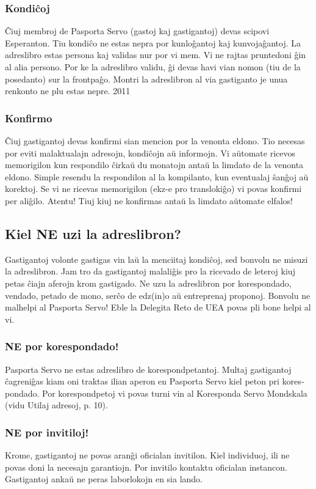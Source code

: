 \subsubsection{Kondiĉoj}
Ĉiuj membroj de Pasporta Servo (gastoj kaj gastigantoj) devas scipovi Esperanton.
Tiu kondiĉo ne estas nepra por kunloĝantoj kaj kunvojaĝantoj.
La adreslibro estas persona kaj validas nur por vi mem. Vi ne rajtas pruntedoni
ĝin al alia persono. Por ke la adreslibro validu, ĝi devas havi vian nomon (tiu de la
posedanto) sur la frontpaĝo. Montri la adreslibron al via gastiganto je unua renkonto
ne plu estas nepre.
2011	
\subsubsection{Konfirmo}
Ĉiuj gastigantoj devas konfirmi sian mencion por la venonta eldono. Tio necesas por
eviti malaktualajn adresojn, kondiĉojn aŭ informojn. Vi aŭtomate ricevos memorigilon
kun respondilo ĉirkaŭ du monatojn antaŭ la limdato de la venonta eldono. Simple
resendu la respondilon al la kompilanto, kun eventualaj ŝanĝoj aŭ korektoj. Se vi
ne ricevas memorigilon (ekz-e pro translokiĝo) vi povas konfirmi per aliĝilo. Atentu!
Tiuj kiuj ne konfirmas antaŭ la limdato aŭtomate elfalos!

\subsection{Kiel NE uzi la adreslibron?}
Gastigantoj volonte gastigas vin laŭ la menciitaj kondiĉoj, sed bonvolu ne misuzi
la adreslibron. Jam tro da gastigantoj malaliĝis pro la ricevado de leteroj kiuj petas
ĉiajn aferojn krom gastigado. Ne uzu la adreslibron por korespondado, vendado,
petado de mono, serĉo de edz(in)o aŭ entreprenaj proponoj. Bonvolu ne malhelpi al
Pasporta Servo! Eble la Delegita Reto de UEA povas pli bone helpi al vi.
\subsubsection{NE por korespondado!}
Pasporta Servo ne estas adreslibro de korespondpetantoj. Multaj gastigantoj
ĉagreniĝas kiam oni traktas ilian aperon en Pasporta Servo kiel peton pri kores­
pon­dado. Por korespondpetoj vi povas turni vin al Koresponda Servo Mondskala
(vidu Utilaj adresoj, p. 10).
\subsubsection{NE por invitiloj!}
Krome, gastigantoj ne povas aranĝi oficialan invitilon. Kiel individuoj, ili ne povas
doni la necesajn garantiojn. Por invitilo kontaktu oficialan instancon. Gastigantoj
ankaŭ ne peras laborlokojn en sia lando.
